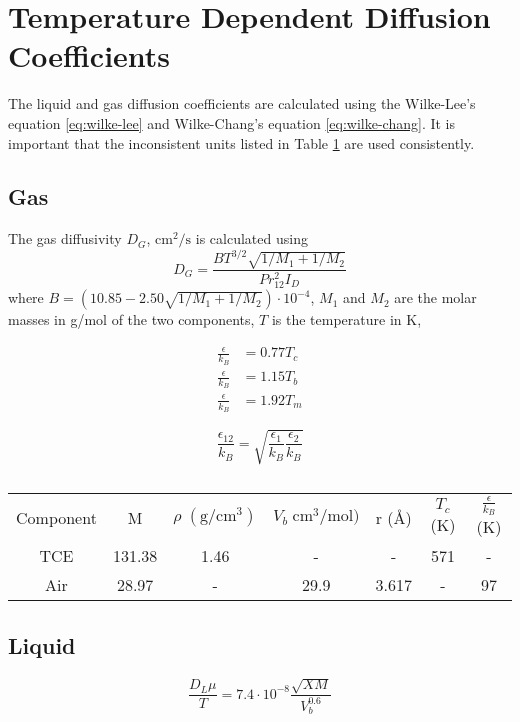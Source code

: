 
\section{Temperature Dependent Diffusion Coefficients}

The liquid and gas diffusion coefficients are calculated using the Wilke-Lee's equation \eqref{eq:wilke-lee} and Wilke-Chang's equation \eqref{eq:wilke-chang}.
It is important that the inconsistent units listed in Table \ref{tbl:dg_inputs} are used consistently.
\subsection{Gas}

The gas diffusivity $D_G$, $\mathrm{cm^2/s}$ is calculated using
\begin{equation}\label{eq:wilke-lee}
  D_G =  \frac{BT^{3/2}\sqrt{1/M_1+1/M_2}}{P r_{12}^2 I_D}
\end{equation}
where $B = (10.85-2.50\sqrt{1/M_1+1/M_2})\cdot 10^{-4}$, $M_1$ and $M_2$ are the molar masses in g/mol of the two components, $T$ is the temperature in K,

\begin{align}
  \frac{\epsilon}{k_B} &= 0.77 T_c \\
  \frac{\epsilon}{k_B} &= 1.15 T_b \\
  \frac{\epsilon}{k_B} &= 1.92 T_m
\end{align}


\begin{equation}
  \frac{\epsilon_{12}}{k_B} = \sqrt{\frac{\epsilon_1}{k_B}\frac{\epsilon_2}{k_B}}
\end{equation}


\begin{table}
  \centering
  \begin{tabular}{c c c c c c c}
    \toprule
    Component & M & $\rho \; \mathrm{(g/cm^3)}$ & $V_b \; \mathrm{cm^3/mol)}$ & r (Å) & $T_c$ (K) & $\frac{\epsilon}{k_B}$ (K) \\
    TCE & 131.38 & 1.46 & - & - & 571 & - \\
    Air & 28.97 & - & 29.9 & 3.617 & - & 97 \\
    \bottomrule
  \end{tabular}
  \caption{}
  \label{tbl:dg_inputs}
\end{table}

\subsection{Liquid}

\begin{equation}\label{eq:wilke-chang}
  \frac{D_L \mu}{T} = 7.4\cdot10^{-8} \frac{\sqrt{XM}}{V_b^{0.6}}
\end{equation}

